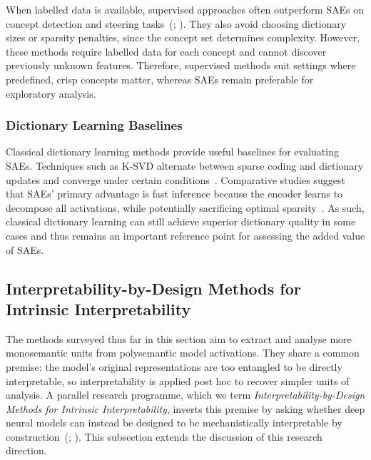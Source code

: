 When labelled data is available, supervised approaches often outperform SAEs on concept detection and steering tasks~(; ). They also avoid choosing dictionary sizes or sparsity penalties, since the concept set determines complexity. However, these methods require labelled data for each concept and cannot discover previously unknown features. Therefore, supervised methods suit settings where predefined, crisp concepts matter, whereas SAEs remain preferable for exploratory analysis.

\subsubsection{Dictionary Learning Baselines}
Classical dictionary learning methods provide useful baselines for evaluating SAEs. Techniques such as K-SVD alternate between sparse coding and dictionary updates and converge under certain conditions~. Comparative studies suggest that SAEs' primary advantage is fast inference because the encoder learns to decompose all activations, while potentially sacrificing optimal sparsity~. As such, classical dictionary learning can still achieve superior dictionary quality in some cases and thus remains an important reference point for assessing the added value of SAEs.

\subsection{Interpretability-by-Design Methods for Intrinsic Interpretability}
\label{sec:architectural-interventions}

The methods surveyed thus far in this section aim to extract and analyse more monosemantic units from polysemantic model activations. They share a common premise: the model's original representations are too entangled to be directly interpretable, so interpretability is applied post hoc to recover simpler units of analysis. A parallel research programme, which we term \emph{Interpretability-by-Design Methods for Intrinsic Interpretability}, inverts this premise by asking whether deep neural models can instead be designed to be mechanistically interpretable by construction~(; ). This subsection extends the discussion of this research direction.

